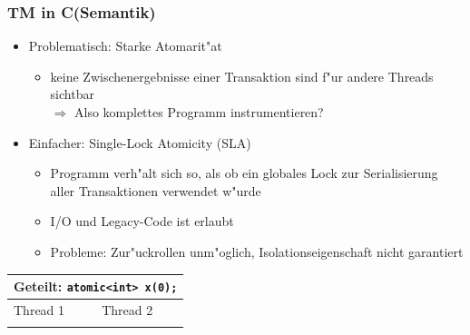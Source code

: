 \documentclass[t]{beamer}
\newcommand{\Rplus}{\protect\raisebox{.1ex}{+}}
\newcommand{\Cpp}{\mbox{C\Rplus\Rplus}\xspace}
\begin{document}
\lstset{language=C++}
\begin{frame}[fragile]
  \frametitle{TM in \Cpp (Semantik)}

  \begin{itemize}
  \item Problematisch: Starke Atomarit"at
    \begin{itemize}
    \item keine Zwischenergebnisse einer Transaktion sind f"ur andere Threads sichtbar \\
          $\Rightarrow$ Also komplettes Programm instrumentieren?
    \end{itemize}
  \item Einfacher: Single-Lock Atomicity (SLA) \cite{TMSemanticsC++}
    \begin{itemize}
    \item Programm verh"alt sich so, als ob ein globales Lock zur Serialisierung
          aller Transaktionen verwendet w"urde
    \item I/O und Legacy-Code ist erlaubt
    \item Probleme: Zur"uckrollen unm"oglich, Isolationseigenschaft nicht garantiert
    \end{itemize}
  \end{itemize}

  \begin{center}
  \begin{tabular}{| l || l |} \hline
  \multicolumn{2}{|c|}{Geteilt: \lstinline|atomic<int> x(0);|} \\ \hline
  Thread 1 & Thread 2 \\ \hline

  \vtop{\null\hbox{\begin{lstlisting}
transaction {
  x = 1;


  while (x == 1) { }
}
  \end{lstlisting}}}

  &

  \vtop{\null\hbox{\begin{lstlisting}


while (x == 0) { }
x = 0;
  \end{lstlisting}}}

  \\
  \hline
  \end{tabular}
  \end{center}

\end{frame}
\end{document}

